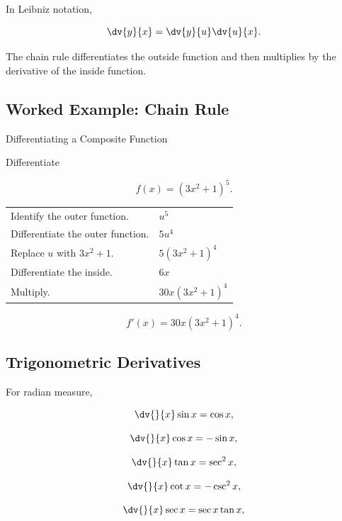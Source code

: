 In Leibniz notation,

\[ \dv{y}{x}=\dv{y}{u}\dv{u}{x}. \]

The chain rule differentiates the outside function and then multiplies by
the derivative of the inside function.

\subsection{Worked Example: Chain Rule}
\label{subsec:worked-chain-rule}

\begin{workedexamplebox}{Differentiating a Composite Function}

Differentiate

\[ f(x)=(3x^2+1)^5. \]

\begin{tabularx}{\textwidth}{@{}>{\raggedright\arraybackslash}p{}X@{}}
Identify the outer function. &
\(u^5\)\\
Differentiate the outer function. &
\(5u^4\)\\
Replace \(u\) with \(3x^2+1\). &
\(5(3x^2+1)^4\)\\
Differentiate the inside. &
\(6x\)\\
Multiply. &
\(30x(3x^2+1)^4\)
\end{tabularx}

\begin{answerbox}
\[ \boxed{f'(x)=30x(3x^2+1)^4.} \]
\end{answerbox}
\end{workedexamplebox}

\subsection{Trigonometric Derivatives}
\label{subsec:trigonometric-derivatives}

For radian measure,

\[ \dv{}{x}\sin x=\cos x, \]

\[ \dv{}{x}\cos x=-\sin x, \]

\[ \dv{}{x}\tan x=\sec^2x, \]

\[ \dv{}{x}\cot x=-\csc^2x, \]

\[ \dv{}{x}\sec x=\sec x\tan x, \]


